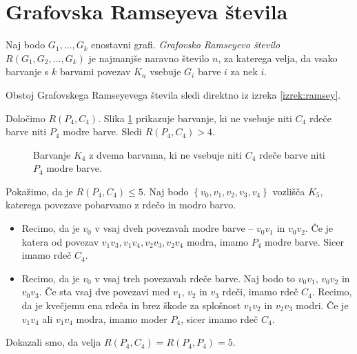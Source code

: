 \documentclass[twoside,11pt]{article}
\providecommand{\set}[1]{\left\{#1\right\}}
\begin{document}
\section{Grafovska Ramseyeva števila}

\begin{definicija}
    Naj bodo $G_1, \dots, G_k$ enostavni grafi. \emph{Grafovsko Ramseyevo število}
    $R(G_1, G_2, \dots, G_k)$ je najmanjše naravno število $n$, za katerega velja, da 
    vsako barvanje s $k$ barvami povezav $K_n$ vsebuje $G_i$ barve $i$ za nek $i$. 
\end{definicija}

Obstoj Grafovskega Ramseyevega števila sledi direktno iz izreka \ref{izrek:ramsey}.

\begin{zgled}
    Določimo $R(P_4, C_4)$.
    Slika \ref{fig:p4c4} prikazuje barvanje, ki ne vsebuje niti $C_4$ rdeče 
    barve niti $P_4$ modre barve. Sledi $R(P_4,C_4) > 4$.

    \begin{figure}[h!]
        \centering
        \newcommand\size{1}
        \caption{Barvanje $K_{4}$ z dvema barvama, ki ne vsebuje niti $C_4$ rdeče 
        barve niti $P_4$ modre barve.}
        \label{fig:p4c4}
    \end{figure}

    Pokažimo, da je $R(P_4, C_4) \le 5$. Naj bodo $\set{v_0, v_1, v_2, v_3, v_4}$ vozlišča
    $K_5$, katerega povezave pobarvamo z rdečo in modro barvo.
    \begin{itemize}
        \item Recimo, da je $v_0$ v vsaj dveh povezavah modre barve -- $v_0v_1$ in $v_0v_2$. Če je
        katera od povezav $v_1v_3, v_1v_4, v_2v_3, v_2v_4$ modra, imamo $P_4$ modre barve.
        Sicer imamo rdeč $C_4$.

        \item Recimo, da je $v_0$ v vsaj treh povezavah rdeče barve. Naj bodo to $v_0v_1$, $v_0v_2$
        in $v_0v_3$. Če sta vsaj dve povezavi med $v_1$, $v_2$ in $v_3$ rdeči, imamo 
        rdeč $C_4$. Recimo, da je kvečjemu ena rdeča in brez škode za splošnost $v_1v_2$ in $v_2v_3$ 
        modri. Če je $v_1v_4$ ali $v_1v_4$ modra, imamo moder $P_4$, sicer imamo rdeč $C_4$.
    \end{itemize}

    Dokazali smo, da velja $R(P_4, C_4) = R(P_4, P_4) = 5$.
\end{zgled}
\end{document}
